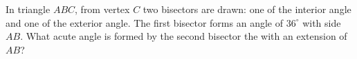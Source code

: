 In triangle $ABC$, from vertex $C$ two bisectors are drawn: one of the interior angle and one of the exterior angle. The first bisector forms an angle of $36^{\circ}$ with side $AB$. What acute angle is formed by the second bisector the with an extension of $AB$?
